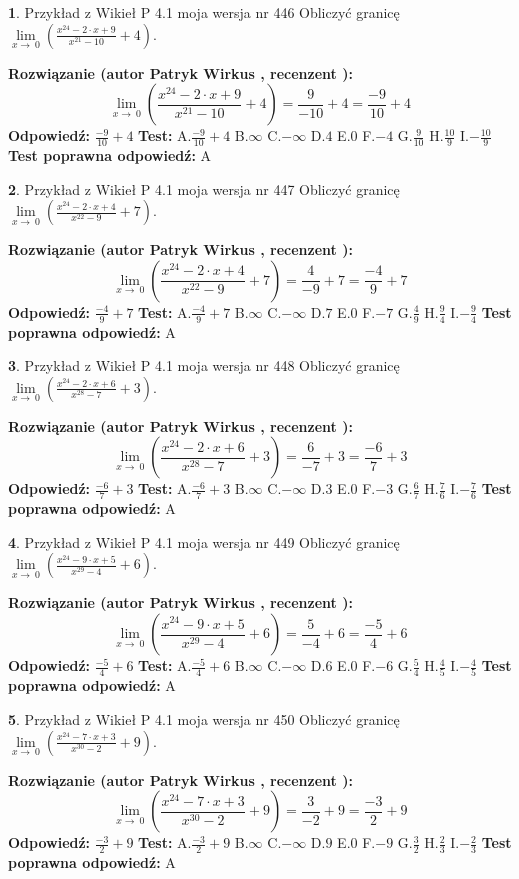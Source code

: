 \documentclass[12pt, a4paper]{article}
\theoremstyle{definition} %
\newtheorem{zad}{}
\newcommand{\zadStart}[1]{\begin{zad}#1\newline}
\newcommand{\zadStop}{\end{zad}}
\newcommand{\rozwStart}[2]{\noindent \textbf{Rozwiązanie (autor #1 , recenzent #2): }\newline}
\newcommand{\rozwStop}{\newline}
\newcommand{\odpStart}{\noindent \textbf{Odpowiedź:}\newline}
\newcommand{\odpStop}{\newline}
\newcommand{\testStart}{\noindent \textbf{Test:}\newline}
\newcommand{\testStop}{\newline}
\newcommand{\kluczStart}{\noindent \textbf{Test poprawna odpowiedź:}\newline}
\newcommand{\kluczStop}{\newline}
\begin{document}
\zadStart{Przykład z Wikieł P 4.1 moja wersja nr 446}
Obliczyć granicę $\lim\limits_{x\to\ 0}(\frac{x^{24}-2 \cdot x +9}{x^{21}-10}+4)$.
\zadStop
\rozwStart{Patryk Wirkus}{}
$$\lim\limits_{x\to\ 0}(\frac{x^{24}-2 \cdot x +9}{x^{21}-10}+4)=\frac{9}{-10}+4=\frac{-9}{10}+4$$
\rozwStop
\odpStart
$\frac{-9}{10}+4$
\odpStop
\testStart
A.$\frac{-9}{10}+4$
B.$\infty$
C.$-\infty$
D.$4$
E.$0$
F.$-4$
G.$\frac{9}{10}$
H.$\frac{10}{9}$
I.$-\frac{10}{9}$
\testStop
\kluczStart
A
\kluczStop



\zadStart{Przykład z Wikieł P 4.1 moja wersja nr 447}
Obliczyć granicę $\lim\limits_{x\to\ 0}(\frac{x^{24}-2 \cdot x +4}{x^{22}-9}+7)$.
\zadStop
\rozwStart{Patryk Wirkus}{}
$$\lim\limits_{x\to\ 0}(\frac{x^{24}-2 \cdot x +4}{x^{22}-9}+7)=\frac{4}{-9}+7=\frac{-4}{9}+7$$
\rozwStop
\odpStart
$\frac{-4}{9}+7$
\odpStop
\testStart
A.$\frac{-4}{9}+7$
B.$\infty$
C.$-\infty$
D.$7$
E.$0$
F.$-7$
G.$\frac{4}{9}$
H.$\frac{9}{4}$
I.$-\frac{9}{4}$
\testStop
\kluczStart
A
\kluczStop



\zadStart{Przykład z Wikieł P 4.1 moja wersja nr 448}
Obliczyć granicę $\lim\limits_{x\to\ 0}(\frac{x^{24}-2 \cdot x +6}{x^{28}-7}+3)$.
\zadStop
\rozwStart{Patryk Wirkus}{}
$$\lim\limits_{x\to\ 0}(\frac{x^{24}-2 \cdot x +6}{x^{28}-7}+3)=\frac{6}{-7}+3=\frac{-6}{7}+3$$
\rozwStop
\odpStart
$\frac{-6}{7}+3$
\odpStop
\testStart
A.$\frac{-6}{7}+3$
B.$\infty$
C.$-\infty$
D.$3$
E.$0$
F.$-3$
G.$\frac{6}{7}$
H.$\frac{7}{6}$
I.$-\frac{7}{6}$
\testStop
\kluczStart
A
\kluczStop



\zadStart{Przykład z Wikieł P 4.1 moja wersja nr 449}
Obliczyć granicę $\lim\limits_{x\to\ 0}(\frac{x^{24}-9 \cdot x +5}{x^{29}-4}+6)$.
\zadStop
\rozwStart{Patryk Wirkus}{}
$$\lim\limits_{x\to\ 0}(\frac{x^{24}-9 \cdot x +5}{x^{29}-4}+6)=\frac{5}{-4}+6=\frac{-5}{4}+6$$
\rozwStop
\odpStart
$\frac{-5}{4}+6$
\odpStop
\testStart
A.$\frac{-5}{4}+6$
B.$\infty$
C.$-\infty$
D.$6$
E.$0$
F.$-6$
G.$\frac{5}{4}$
H.$\frac{4}{5}$
I.$-\frac{4}{5}$
\testStop
\kluczStart
A
\kluczStop



\zadStart{Przykład z Wikieł P 4.1 moja wersja nr 450}
Obliczyć granicę $\lim\limits_{x\to\ 0}(\frac{x^{24}-7 \cdot x +3}{x^{30}-2}+9)$.
\zadStop
\rozwStart{Patryk Wirkus}{}
$$\lim\limits_{x\to\ 0}(\frac{x^{24}-7 \cdot x +3}{x^{30}-2}+9)=\frac{3}{-2}+9=\frac{-3}{2}+9$$
\rozwStop
\odpStart
$\frac{-3}{2}+9$
\odpStop
\testStart
A.$\frac{-3}{2}+9$
B.$\infty$
C.$-\infty$
D.$9$
E.$0$
F.$-9$
G.$\frac{3}{2}$
H.$\frac{2}{3}$
I.$-\frac{2}{3}$
\testStop
\kluczStart
A
\kluczStop
\end{document}
